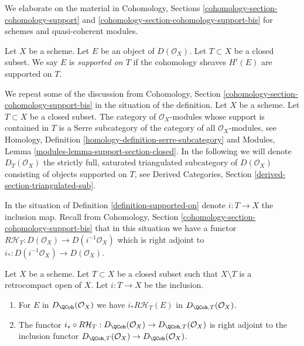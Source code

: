 \noindent
We elaborate on the material in Cohomology, Sections
\ref{cohomology-section-cohomology-support} and
\ref{cohomology-section-cohomology-support-bis} for schemes
and quasi-coherent modules.

\begin{definition}
\label{definition-supported-on}
Let $X$ be a scheme. Let $E$ be an object of $D(\mathcal{O}_X)$.
Let $T \subset X$ be a closed subset.
We say $E$ is {\it supported on $T$} if the
cohomology sheaves $H^i(E)$ are supported on $T$.
\end{definition}

\noindent
We repeat some of the discussion from
Cohomology, Section \ref{cohomology-section-cohomology-support-bis}
in the situation of the definition.
Let $X$ be a scheme. Let $T \subset X$ be a closed subset.
The category of $\mathcal{O}_X$-modules whose
support is contained in $T$ is a Serre subcategory of the
category of all $\mathcal{O}_X$-modules, see
Homology, Definition \ref{homology-definition-serre-subcategory}
and
Modules, Lemma \ref{modules-lemma-support-section-closed}.
In the following we will denote $D_T(\mathcal{O}_X)$
the strictly full, saturated triangulated subcategory of
$D(\mathcal{O}_X)$ consisting of objects supported on $T$, see
Derived Categories, Section \ref{derived-section-triangulated-sub}.

\medskip\noindent
In the situation of Definition \ref{definition-supported-on}
denote $i : T \to X$ the inclusion map. Recall from
Cohomology, Section \ref{cohomology-section-cohomology-support-bis}
that in this situation we have a functor
$R\mathcal{H}_T : D(\mathcal{O}_X) \to D(i^{-1}\mathcal{O}_X)$
which is right adjoint to $i_* : D(i^{-1}\mathcal{O}_X) \to D(\mathcal{O}_X)$.

\begin{lemma}
\label{lemma-support-quasi-coherent}
Let $X$ be a scheme. Let $T \subset X$ be a closed subset such that
$X \setminus T$ is a retrocompact open of $X$. Let $i : T \to X$ be
the inclusion.
\begin{enumerate}
\item For $E$ in $D_\QCoh(\mathcal{O}_X)$ we have
$i_*R\mathcal{H}_T(E)$ in $D_{\QCoh, T}(\mathcal{O}_X)$.
\item The functor
$i_* \circ R\mathcal{H}_T : D_\QCoh(\mathcal{O}_X) \to
D_{\QCoh, T}(\mathcal{O}_X)$ is right adjoint to the inclusion functor
$D_{\QCoh, T}(\mathcal{O}_X) \to D_\QCoh(\mathcal{O}_X)$.
\end{enumerate}
\end{lemma}

